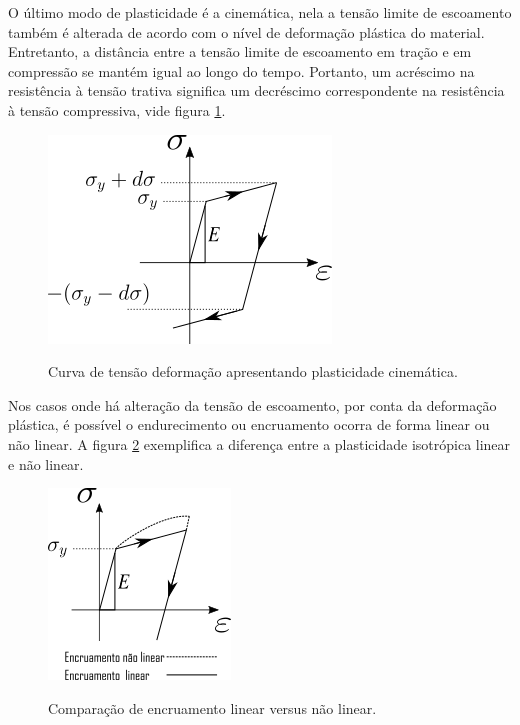 O último modo de plasticidade é a cinemática, nela a tensão limite de escoamento também é alterada de acordo com o nível de deformação plástica do material. Entretanto, a distância entre a tensão limite de escoamento em tração e em compressão se mantém igual ao longo do tempo. Portanto, um acréscimo na resistência à tensão trativa significa um decréscimo correspondente na resistência à tensão compressiva, vide figura \ref{fig:plastcin}.  \par

\begin{figure}[H]
    \centering
    \caption{Curva de tensão deformação apresentando plasticidade cinemática. }
    \includegraphics[width=0.5\linewidth]{images/plasticidade_cinem.png}
    \label{fig:plastcin}
\end{figure}

Nos casos onde há alteração da tensão de escoamento, por conta da deformação plástica, é possível o endurecimento ou encruamento ocorra de forma linear ou não linear. A figura \ref{fig:plastlinvsnlin} exemplifica a diferença entre a plasticidade isotrópica linear e não linear. \par

\begin{figure}[H]
    \centering
    \caption{Comparação de encruamento linear versus não linear. } 
    \includegraphics[width=0.8\linewidth]{images/plasticidade_linnlin.png}
    \label{fig:plastlinvsnlin}
\end{figure}

